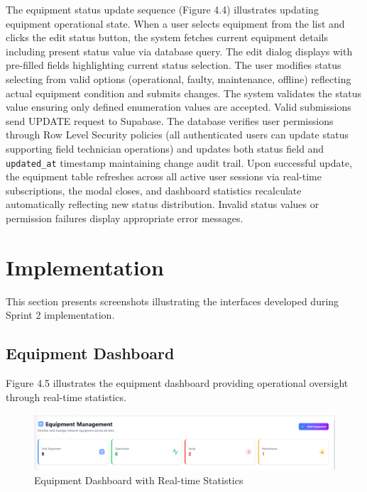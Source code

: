 The equipment status update sequence (Figure 4.4) illustrates updating equipment operational state. When a user selects equipment from the list and clicks the edit status button, the system fetches current equipment details including present status value via database query. The edit dialog displays with pre-filled fields highlighting current status selection. The user modifies status selecting from valid options (operational, faulty, maintenance, offline) reflecting actual equipment condition and submits changes. The system validates the status value ensuring only defined enumeration values are accepted. Valid submissions send UPDATE request to Supabase. The database verifies user permissions through Row Level Security policies (all authenticated users can update status supporting field technician operations) and updates both status field and \texttt{updated\_at} timestamp maintaining change audit trail. Upon successful update, the equipment table refreshes across all active user sessions via real-time subscriptions, the modal closes, and dashboard statistics recalculate automatically reflecting new status distribution. Invalid status values or permission failures display appropriate error messages.

\section{Implementation}

This section presents screenshots illustrating the interfaces developed during Sprint 2 implementation.

\subsection{Equipment Dashboard}

Figure 4.5 illustrates the equipment dashboard providing operational oversight through real-time statistics.

\begin{figure}[H]
    \centering
    \includegraphics[width=0.9\linewidth]{img/chap_04/equipment_dashboard.png}
    \caption{Equipment Dashboard with Real-time Statistics}
    \label{fig:equipment_dashboard}
\end{figure}


